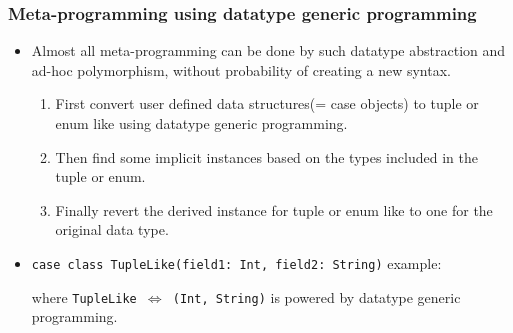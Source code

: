 \begin{frame}[fragile]
  \frametitle{Meta-programming using datatype generic programming}
  
  \begin{itemize}
    \item Almost all meta-programming can be done by such datatype abstraction
    and ad-hoc polymorphism, without probability of creating a new syntax.
    \begin{enumerate}
      \item First convert user defined data structures(= case objects) to tuple or enum like using datatype generic programming.
      \item Then find some implicit instances based on the types included in the tuple or enum.
      \item Finally revert the derived instance for tuple or enum like to one for the original data type.
    \end{enumerate}

    \item \lstinline|case class TupleLike(field1: Int, field2: String)| example:
    \begin{scaledprooftree}{0.8}
    \end{scaledprooftree}
    where {\small \texttt{TupleLike $\Leftrightarrow$ (Int, String)}} is powered by datatype generic programming.
  \end{itemize}

\end{frame}

